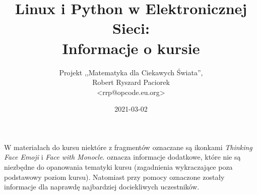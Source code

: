 \documentclass{pdfBooklets}
\title{Linux i Python w Elektronicznej Sieci:\\ Informacje o kursie}
\author{%
	Projekt ,,Matematyka dla Ciekawych Świata'',\\
	Robert Ryszard Paciorek\\\normalsize\ttfamily <rrp@opcode.eu.org>
}
\date  {2021-03-02}
\begin{document}
\maketitle



W materiałach do kursu niektóre z fragmentów oznaczane są ikonkami \textit{Thinking Face Emoji} i \textit{Face with Monocle}.
{} oznacza informacje dodatkowe, które nie są niezbędne do opanowania tematyki kursu (zagadnienia wykraczające poza podstawowy poziom kursu).
Natomiast przy pomocy {} oznaczone zostały informacje dla naprawdę najbardziej dociekliwych uczestników.




\end{document}
